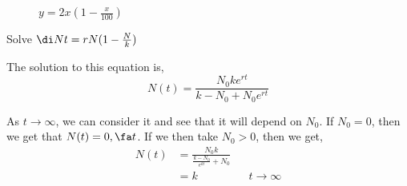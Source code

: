 \begin{figure}[!ht]
\centering
{}
\caption{$y = 2x \left( 1 - \frac{x}{100}\right)$}
\end{figure}

\begin{exercise}
  Solve $\di N t = rN(1 - \frac{N}{k})$
\end{exercise}
The solution to this equation is,
$$ N(t) = \frac{N_0 k e^{rt}}{k - N_0 + N_0e^{rt}} $$

As $t \to \infty$, we can consider it and see that it will depend on $N_0$. If $N_0 = 0$, then we get that $N(t) = 0, \fa t$. If we then take $N_0 > 0$, then we get,
\begin{align*}
  N(t) &= \frac{N_0 k}{\frac{k - N_0}{e^{kt}} + N_0}\\
  &= k && t \to \infty
\end{align*}
